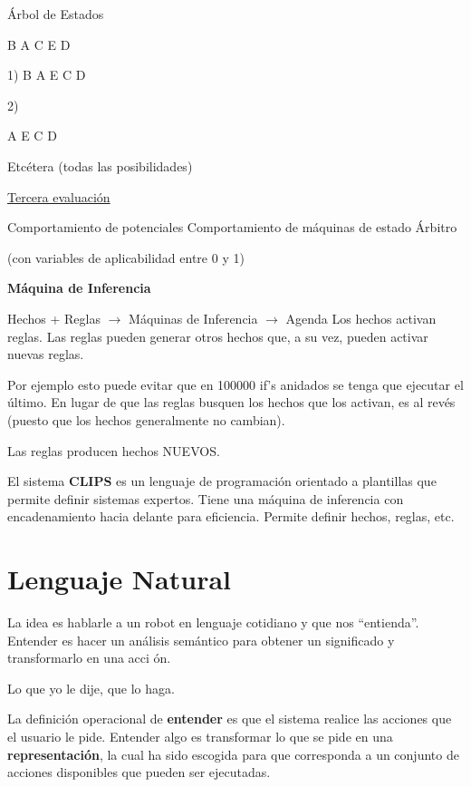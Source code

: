 Árbol de Estados

B A
C E
D


1) B
A E
C D

2)


A E
C D


Etcétera (todas las posibilidades)

\underline{Tercera evaluación}

Comportamiento de potenciales
Comportamiento de máquinas de estado
Árbitro


(con variables de aplicabilidad entre 0 y 1)



\textbf{Máquina de Inferencia}


Hechos + Reglas $\rightarrow$ Máquinas de Inferencia $\rightarrow$ Agenda
Los hechos activan reglas. Las reglas pueden generar otros hechos que, a su vez, pueden activar nuevas
reglas.

Por ejemplo esto puede evitar que en 100000 if’s anidados se tenga que ejecutar el último.
En lugar de que las reglas busquen los hechos que los activan, es al revés (puesto que los hechos
generalmente no cambian).


Las reglas producen hechos NUEVOS.

El sistema \textbf{CLIPS} es un lenguaje de programación orientado a plantillas que permite definir sistemas
expertos. Tiene una máquina de inferencia con encadenamiento hacia delante para eficiencia.
Permite definir hechos, reglas, etc.


\section{Lenguaje Natural}

La idea es hablarle a un robot en lenguaje cotidiano y que nos “entienda”. Entender es hacer un análisis
semántico para obtener un significado y transformarlo en una acci
ón.

Lo que yo le dije, que lo haga.

La definición operacional de \textbf{entender} es que el sistema realice las acciones que el usuario le pide.
Entender algo es transformar lo que se pide en una \textbf{representación}, la cual ha sido escogida para que
corresponda a un conjunto de acciones disponibles que pueden ser ejecutadas.


